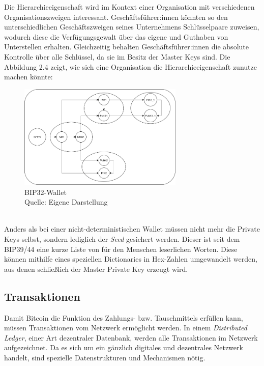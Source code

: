 Die Hierarchieeigenschaft wird im Kontext einer Organisation mit verschiedenen Organisationszweigen interessant. Geschäftsführer:innen könnten so den unterschiedlichen Geschäftszweigen seines Unternehmens Schlüsselpaare zuweisen, wodurch diese die Verfügungsgewalt über das eigene und Guthaben von Unterstellen erhalten. Gleichzeitig behalten Geschäftsführer:innen die absolute Kontrolle über alle Schlüssel, da sie im Besitz der Master Keys sind. Die Abbildung 2.4 zeigt, wie sich eine Organisation die Hierarchieeigenschaft zunutze machen könnte:
\begin{figure}[htpb]
	\centering
	\includegraphics[width=0.7\textwidth]{images/bip32_wallet.png}
	\caption{BIP32-Wallet\\
	Quelle: Eigene Darstellung}
	\label{6braun:fig:_wallet}
\end{figure}\\
Anders als bei einer nicht-deterministischen Wallet müssen nicht mehr die Private Keys selbst, sondern lediglich der \emph{Seed} gesichert werden. Dieser ist seit dem BIP39/44 eine kurze Liste von für den Menschen leserlichen Worten. Diese können mithilfe eines speziellen Dictionaries in Hex-Zahlen umgewandelt werden, aus denen schließlich der Master Private Key erzeugt wird.
\subsection{Transaktionen}
Damit Bitcoin die Funktion des Zahlungs- bzw. Tauschmittels erfüllen kann, müssen Transaktionen vom Netzwerk ermöglicht werden. In einem \emph{Distributed Ledger}, einer Art dezentraler Datenbank, werden alle Transaktionen im Netzwerk aufgezeichnet. Da es sich um ein gänzlich digitales und dezentrales Netzwerk handelt, sind spezielle Datenstrukturen und Mechanismen nötig.
